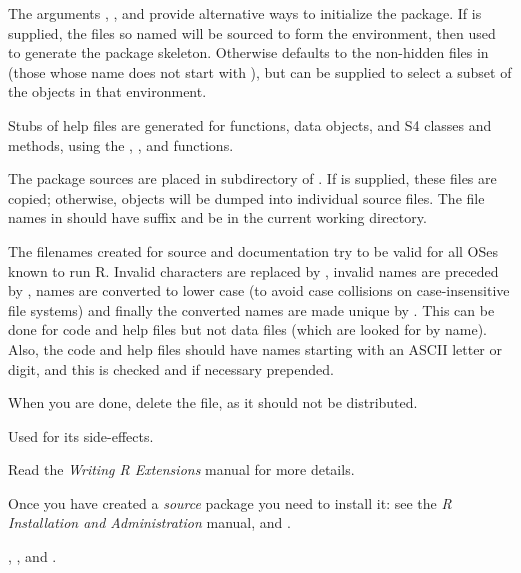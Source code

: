 \begin{Details}\relax
The arguments , , and 
provide alternative ways to initialize the package.  If
 is supplied, the files so named will be sourced to
form the environment, then used to generate the package skeleton.
Otherwise  defaults to the non-hidden files in
 (those whose name does not start with ),
but can be supplied to select a subset of the objects in that
environment.

Stubs of help files are generated for functions, data objects, and
S4 classes and methods, using the ,
,  and  functions.

The package sources are placed in subdirectory  of
.  If  is supplied, these files are
copied; otherwise, objects will be dumped into individual source
files.
The file names in  should  have suffix  and
be in the current working directory.

The filenames created for source and documentation try to be valid for
all OSes known to run R.  Invalid characters are replaced by \samp{\_},
invalid names are preceded by , names are converted to lower
case (to avoid case collisions on case-insensitive file systems) and
finally the converted names are made unique by
.  This can be done for code and
help files but not data files (which are looked for by name). Also,
the code and help files should have names starting with an ASCII
letter or digit, and this is checked and if necessary 
prepended.

When you are done, delete the  file, as it
should not be distributed.
\end{Details}
%
\begin{Value}
Used for its side-effects.
\end{Value}
%
\begin{References}\relax
Read the \emph{Writing R Extensions} manual for more details.

Once you have created a \emph{source} package you need to install it:
see the \emph{R Installation and Administration} manual,
 and .
\end{References}
%
\begin{SeeAlso}\relax
{}, , and
.
\end{SeeAlso}
